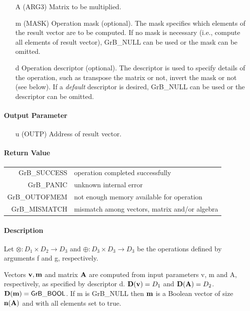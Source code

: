\documentclass[11pt]{extarticle}
\begin{document}
{\begin{itemize}
	\item[{\sf A}] ({\sf ARG3}) Matrix to be multiplied.

	\item[{\sf m}] ({\sf MASK}) Operation mask (optional). The mask
	specifies which elements of the result vector are to be computed.
	If no mask is necessary (i.e., compute all elements of result
	vector), {\sf GrB\_NULL} can be used or the mask can be omitted.

	\item[{\sf d}] Operation descriptor (optional). The descriptor
	is used to specify details of the operation, such as transpose
	the matrix or not, invert the mask or not (see below). If a
	\emph{default} descriptor is desired, {\sf GrB\_NULL} can be
	used or the descriptor can be omitted.
\end{itemize}

\paragraph{Output Parameter}

\begin{itemize}
	\item[{\sf u}] ({\sf OUTP}) Address of result vector.
\end{itemize}

\paragraph{Return Value}

\begin{tabular}{rl} 
{\sf GrB\_SUCCESS} 	& operation completed successfully \\
{\sf GrB\_PANIC}	& unknown internal error \\
{\sf GrB\_OUTOFMEM}	& not enough memory available for operation \\
{\sf GrB\_MISMATCH}	& mismatch among vectors, matrix and/or algebra
\end{tabular}

\paragraph{Description}

Let $\otimes: D_1 \times D_2 \rightarrow D_3$ and $\oplus: D_3 \times
D_3 \rightarrow D_3$ be the operations defined by arguments {\sf f}
and {\sf g}, respectively.

Vectors ${\bf v}, {\bf m}$ and matrix ${\bf A}$ are computed
from input parameters {\sf v}, {\sf m} and {\sf A}, respectively,
as specified by descriptor {\sf d}.  $\bold{D}({\bf v}) = D_1$ and
$\bold{D}({\bf A}) = D_2$.  $\bold{D}({\bf m}) = {\sf GrB\_BOOL}$.
If {\sf m} is {\sf GrB\_NULL} then ${\bf m}$ is a Boolean vector of
size $\bold{n}({\bf A})$ and with all elements set to {\sf true}.

}
\end{document}
